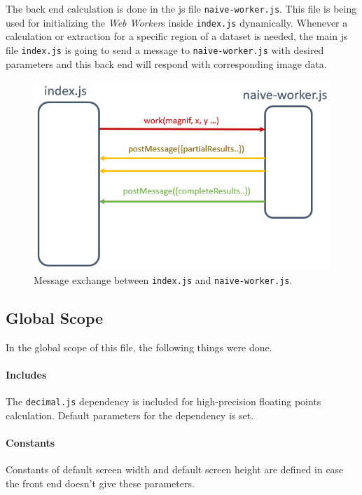 The back end calculation is done in the \gls{js} file \texttt{naive-worker.js}. This file is being used for initializing the \emph{Web Worker}s inside \texttt{index.js} dynamically. Whenever a calculation or extraction for a specific region of a dataset is needed, the main \gls{js} file \texttt{index.js} is going to send a message to \texttt{naive-worker.js} with desired parameters and this back end will respond with corresponding image data.

\begin{figure}[th]
\centering
\includegraphics[width=.85\textwidth,keepaspectratio]{Figures/Chapter4/messageexchange.png}
\decoRule
\caption[Message Exchange]{Message exchange between \texttt{index.js} and \texttt{naive-worker.js}.}
\label{fig:messageexchange}
\end{figure}

\subsection{Global Scope}

In the global scope of this file, the following things were done.

\paragraph{Includes} The \texttt{decimal.js} dependency is included for high-precision floating points calculation. Default parameters for the dependency is set.

\paragraph{Constants} Constants of default screen width and default screen height are defined in case the front end doesn't give these parameters.

